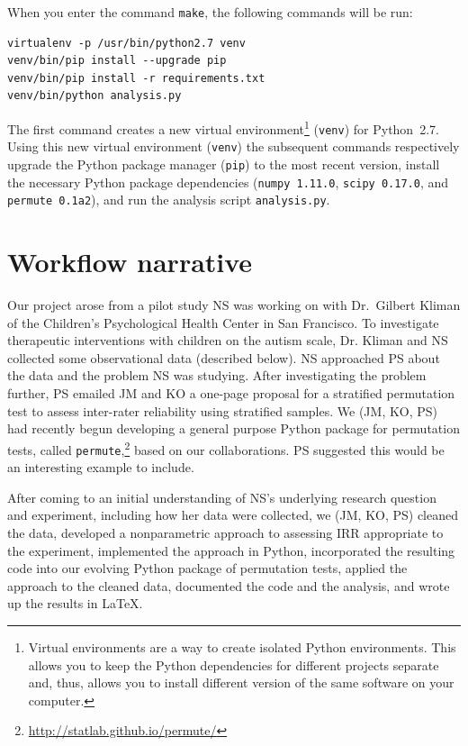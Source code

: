 \documentclass[]{article}
\begin{document}
When you enter the command \texttt{make}, the following commands will be run:
\begin{verbatim}
virtualenv -p /usr/bin/python2.7 venv
venv/bin/pip install --upgrade pip
venv/bin/pip install -r requirements.txt
venv/bin/python analysis.py
\end{verbatim}
The first command creates a new virtual environment\footnote{
Virtual environments are a way to create isolated Python environments.
This allows you to keep the Python dependencies for different
projects separate and, thus, allows you to install different
version of the same software on your computer.
}
(\texttt{venv}) for Python~2.7.
Using this new virtual environment (\texttt{venv}) the subsequent commands
respectively upgrade the Python package manager (\texttt{pip}) to the most
recent version, install the necessary Python package dependencies
(\texttt{numpy~1.11.0}, \texttt{scipy~0.17.0}, and \texttt{permute~0.1a2}),
and run the analysis script \texttt{analysis.py}.

\section{Workflow narrative}

Our project arose from a pilot study NS was working on with Dr.~Gilbert Kliman of
the Children's Psychological Health Center in San Francisco.
To investigate therapeutic interventions with children on the autism scale,
Dr. Kliman and NS collected some observational data (described below).
NS approached PS about the data and the problem NS was studying.
After investigating the problem further, PS emailed JM and KO a one-page
proposal for a stratified permutation test to assess inter-rater
reliability using stratified samples.
We (JM, KO, PS) had recently begun developing a general purpose Python package
for permutation tests, called
\texttt{permute},\footnote{\url{http://statlab.github.io/permute/}}
based on our collaborations.
PS suggested this would be an interesting example to include.

After coming to an initial understanding of NS's underlying research question
and experiment, including how her data were collected, we (JM, KO, PS) 
cleaned the data, developed a nonparametric approach to assessing IRR
appropriate to the experiment, implemented the approach in Python, incorporated
the resulting code into our evolving Python package of permutation tests,
applied the approach to the cleaned data, documented the code and the analysis,
and wrote up the results in \LaTeX. 
\end{document}
